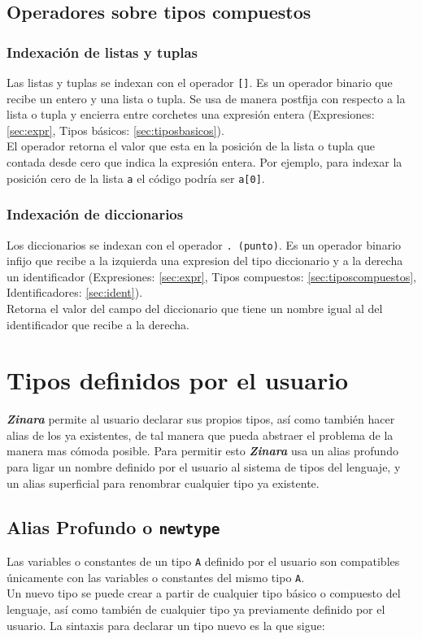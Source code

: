 \documentclass[12pt, spanish]{report}
\begin{document}
\subsection{Operadores sobre tipos compuestos}

\subsubsection{Indexaci\'on de listas y tuplas}
\label{sec:index_list}
Las listas y tuplas se indexan con el operador \texttt{[]}.
Es un operador binario que recibe un entero y una lista o tupla.
Se usa de manera postfija con respecto a la lista o tupla y encierra
entre corchetes una expresi\'on entera (Expresiones: \ref{sec:expr}, 
Tipos b\'asicos: \ref{sec:tiposbasicos}).\\
\indent El operador retorna el valor que esta en la posici\'on
de la lista o tupla que contada desde cero que indica la
expresi\'on entera.
\indent Por ejemplo, para indexar la posici\'on cero
de la lista \texttt{a} el c\'odigo podr\'ia ser \texttt{a[0]}.

\subsubsection{Indexaci\'on de diccionarios}
\label{sec:index_dict}
Los diccionarios se indexan con el operador \texttt{. (punto)}. Es un operador
binario infijo que recibe a la izquierda una expresion del tipo
diccionario y a la derecha un identificador (Expresiones: \ref{sec:expr}, 
Tipos compuestos: \ref{sec:tiposcompuestos}, Identificadores: \ref{sec:ident}).\\
\indent Retorna el valor del campo del diccionario que tiene un nombre
igual al del identificador que recibe a la derecha.

\section{Tipos definidos por el usuario}
\label{sec:tiposusuario}
\emph{\textbf{Zinara}} permite al usuario declarar sus propios tipos,
así como también hacer alias de los ya existentes, de tal manera que
pueda abstraer el problema de la manera mas c\'omoda posible. Para
permitir esto \emph{\textbf{Zinara}} usa un alias profundo para ligar
un nombre definido por el usuario al sistema de tipos del lenguaje, y
un alias superficial para renombrar cualquier tipo ya existente.

\subsection{Alias Profundo o \texttt{newtype}}
\label{sec:tiposusuario:newtype}
Las variables o constantes de un tipo \texttt{A} definido por el
usuario son compatibles \'unicamente con las variables o constantes
del mismo tipo \texttt{A}.\\
\indent Un nuevo tipo se puede crear a partir de cualquier tipo
b\'asico o compuesto del lenguaje, así como también de cualquier tipo
ya previamente definido por el usuario. La sintaxis para declarar un
tipo nuevo es la que sigue:
\end{document}
